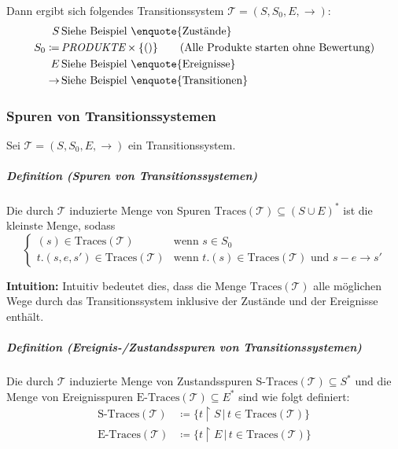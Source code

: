 \documentclass[a4paper, 11pt, accentcolor = tud3b]{tudreport}
\newcommand{\forwhich}{\ensuremath{{\,\vert\,}}}
\newcommand{\subsubparagraph}[1]{\hspace{1cm} \textbf{#1:}}
\newcommand{\definition}[2]{\subparagraph{Definition (#1)} #2}
\newcommand{\intuition}[1]{\subsubparagraph{Intuition} #1}
\begin{document}
				    Dann ergibt sich folgendes Transitionssystem $ \mathcal{T} = (S, S _ 0, E, \rightarrow) $:
				    \begin{align*}
					    S &\, \text{Siehe Beispiel \enquote{Zustände}} \\
					    S _ 0 \coloneqq&\, \textit{PRODUKTE} \times \{ () \} \tag{Alle Produkte starten ohne Bewertung} \\
					    E &\, \text{Siehe Beispiel \enquote{Ereignisse}} \\
					    \rightarrow &\, \text{Siehe Beispiel \enquote{Transitionen}} \\
				    \end{align*}
			    
			    \subsubsection{Spuren von Transitionssystemen}
				    Sei $ \mathcal{T} = (S, S _ 0, E, \rightarrow) $ ein Transitionssystem.

				    \definition{Spuren von Transitionssystemen}{
				    	Die durch $ \mathcal{T} $ induzierte Menge von Spuren $ \text{Traces}(\mathcal{T}) \subseteq (S \cup E) ^ * $ ist die kleinste Menge, sodass
				    	\begin{equation*}
					    	\begin{cases}
						    	(s) \in \text{Traces}(\mathcal{T}) & \text{wenn } s \in S _ 0 \\
						    	t.(s, e, s') \in \text{Traces}(\mathcal{T}) & \text{wenn } t.(s) \in \text{Traces}(\mathcal{T}) \text{ und } s - e \rightarrow s'
					    	\end{cases}
				    	\end{equation*}
				    	
				    	\intuition{Intuitiv bedeutet dies, dass die Menge $ \text{Traces}(\mathcal{T}) $ alle möglichen Wege durch das Transitionssystem inklusive der Zustände und der Ereignisse enthält.}
				    }
				    
				    \definition{Ereignis-/Zustandsspuren von Transitionssystemen}{
					    Die durch $ \mathcal{T} $ induzierte Menge von Zustandsspuren $ \text{S-Traces}(\mathcal{T}) \subseteq S ^ * $ und die Menge von Ereignisspuren $ \text{E-Traces}(\mathcal{T}) \subseteq E ^ * $ sind wie folgt definiert:
					    \begin{align*}
						    \text{S-Traces}(\mathcal{T}) &\coloneqq \{ t \upharpoonright S \forwhich t \in \text{Traces}(\mathcal{T}) \} \\
						    \text{E-Traces}(\mathcal{T}) &\coloneqq \{ t \upharpoonright E \forwhich t \in \text{Traces}(\mathcal{T}) \} \\
					    \end{align*}
				    }
			    
\end{document}
